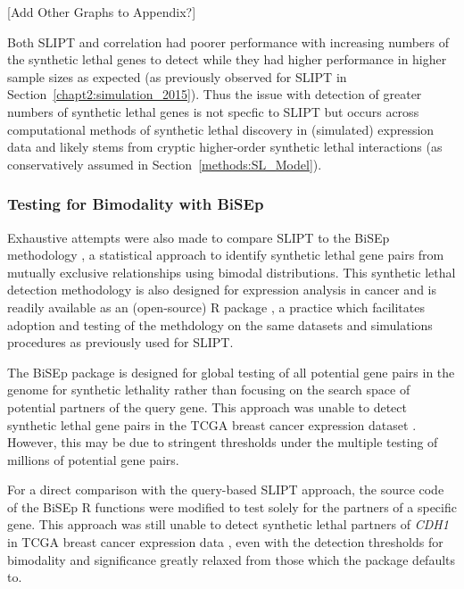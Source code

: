 [Add Other Graphs to Appendix?]


Both \gls{SLIPT} and correlation had poorer performance with increasing numbers of the synthetic lethal genes to detect while they had higher performance in higher sample sizes as expected (as previously observed for \gls{SLIPT} in Section~\ref{chapt2:simulation_2015}). Thus the issue with detection of greater numbers of synthetic lethal genes is not specfic to \gls{SLIPT} but occurs across computational methods of synthetic lethal discovery in (simulated) expression data and likely stems from cryptic higher-order synthetic lethal interactions (as conservatively assumed in Section~\ref{methods:SL_Model}). 
    
\FloatBarrier

\subsubsection{Testing for Bimodality with BiSEp}
\label{chap5:compare_bisep}

Exhaustive attempts were also made to compare \gls{SLIPT} to the \gls{BiSEp} methodology \citep{Wappett2016}, a statistical approach to identify synthetic lethal gene pairs from mutually exclusive relationships using bimodal distributions. This synthetic lethal detection methodology is also designed for expression analysis in cancer and is readily available as an (open-source) R package \citep{Wappett2014}, a practice which facilitates adoption and testing of the methdology on the same datasets and simulations procedures as previously used for \gls{SLIPT}.

The \gls{BiSEp} package is designed for global testing of all potential gene pairs in the genome for synthetic lethality rather than focusing on the search space of  potential partners of the query gene. This approach was unable to detect synthetic lethal gene pairs in the TCGA breast cancer expression dataset \citep{TCGA2012}. However, this may be due to stringent thresholds under the multiple testing of millions of potential gene pairs.

For a direct comparison with the query-based \gls{SLIPT} approach, the source code of the \gls{BiSEp} R functions were modified to test solely for the partners of a specific gene. This approach was still unable to detect synthetic lethal partners of \textit{CDH1} in TCGA breast cancer expression data \citep{TCGA2012}, even with the detection thresholds for bimodality and significance greatly relaxed from those which the package defaults to.

